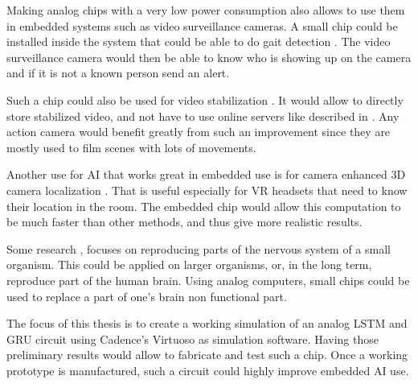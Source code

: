 Making analog chips with a very low power consumption also allows to use them in embedded systems such as video surveillance cameras. A small chip could be installed inside the system that could be able to do gait detection \cite{gaitDS,gaitDig,gait}. The video surveillance camera would then be able to know who is showing up on the camera and if it is not a known person send an alert.

Such a chip could also be used for video stabilization \cite{videoStab}. It would allow to directly store stabilized video, and not have to use online servers like described in \cite{videoStab}. Any action camera would benefit greatly from such an improvement since they are mostly used to film scenes with lots of movements.

Another use for \ac{AI} that works great in embedded use is for camera enhanced 3D camera localization \cite{videoReloc}. That is useful especially for \ac{VR} headsets that need to know their location in the room. The embedded chip would allow this computation to be much faster than other methods, and thus give more realistic results.

Some research \cite{celegans}, focuses on reproducing parts of the nervous system of a small organism. This could be applied on larger organisms, or, in the long term, reproduce part of the human brain. Using analog computers, small chips could be used to replace a part of one's brain non functional part.

The focus of this thesis is to create a working simulation of an analog \ac{LSTM} and \ac{GRU} circuit using Cadence's Virtuoso as simulation software. Having those preliminary results would allow to fabricate and test such a chip. Once a working prototype is manufactured, such a circuit could highly improve embedded \ac{AI} use.
